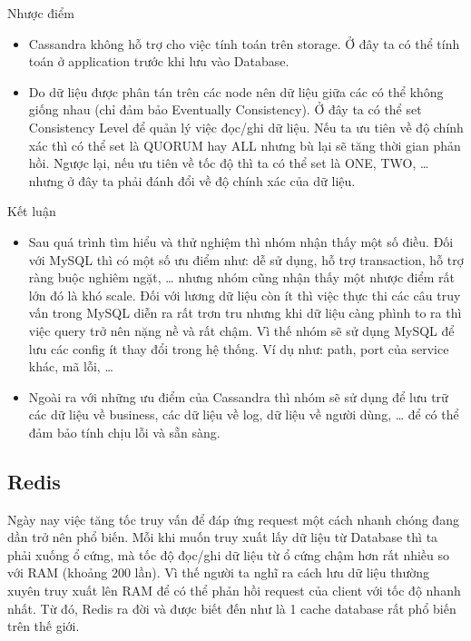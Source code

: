 \begin{itemize}
            Nhược điểm
            
            \begin{itemize}
                \item Cassandra không hỗ trợ cho việc tính toán trên storage. Ở đây ta có thể tính toán ở application trước khi lưu vào Database.
                \item Do dữ liệu được phân tán trên các node nên dữ liệu giữa các có thể không giống nhau (chỉ đảm bảo Eventually Consistency). Ở đây ta có thể set Consistency Level để quản lý việc đọc/ghi dữ liệu. Nếu ta ưu tiên về độ chính xác thì có thể set là QUORUM hay ALL nhưng bù lại sẽ tăng thời gian phản hồi. Ngược lại, nếu ưu tiên về tốc độ thì ta có thể set là ONE, TWO, … nhưng ở đây ta phải đánh đổi về độ chính xác của dữ liệu.
            \end{itemize}
            
            Kết luận
            
            \begin{itemize}
                \item Sau quá trình tìm hiểu và thử nghiệm thì nhóm nhận thấy một số điều. Đối với MySQL thì có một số ưu điểm như: dễ sử dụng, hỗ trợ transaction, hỗ trợ ràng buộc nghiêm ngặt, … nhưng nhóm cũng nhận thấy một nhược điểm rất lớn đó là khó scale. Đối với lương dữ liệu còn ít thì việc thực thi các câu truy vấn trong MySQL diễn ra rất trơn tru nhưng khi dữ liệu càng phình to ra thì việc query trở nên nặng nề và rất chậm. Vì thế nhóm sẽ sử dụng MySQL để lưu các config ít thay đổi trong hệ thống. Ví dụ như: path, port của service khác, mã lỗi, …
                \item Ngoài ra với những ưu điểm của Cassandra thì nhóm sẽ sử dụng để lưu trữ các dữ liệu về business, các dữ liệu về log, dữ liệu về người dùng, … để có thể đảm bảo tính chịu lỗi và sẵn sàng.
            \end{itemize}
            \subsection{Redis}
            
            Ngày nay việc tăng tốc truy vấn để đáp ứng request một cách nhanh chóng đang dần trở nên phổ biến. Mỗi khi muốn truy xuất lấy dữ liệu từ Database thì ta phải xuống ổ cứng, mà tốc độ đọc/ghi dữ liệu từ ổ cứng chậm hơn rất nhiều so với RAM (khoảng 200 lần). Vì thế người ta nghĩ ra cách lưu dữ liệu thường xuyên truy xuất lên RAM để có thể phản hồi request của client với tốc độ nhanh nhất. Từ đó, Redis ra đời và được biết đến như là 1 cache database rất phổ biến trên thế giới.
            

\end{itemize}
